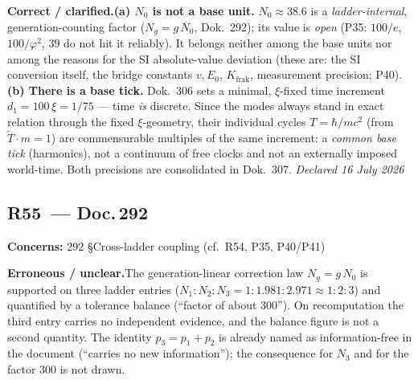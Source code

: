 \smallskip\noindent\textbf{Correct / clarified.}\quad \textbf{(a) $N_0$ is not a base unit.} $N_0\approx38.6$ is a \emph{ladder-internal}, generation-counting factor ($N_g=g\,N_0$, Dok.~292); its value is \emph{open} (P35: $100/e$, $100/\varphi^2$, $39$ do not hit it reliably). It belongs neither among the base units nor among the reasons for the SI absolute-value deviation (these are: the SI conversion itself, the bridge constants $v,E_0$, $K_{\text{frak}}$, measurement precision; P40). \textbf{(b) There is a base tick.} Dok.~306 sets a minimal, $\xi$-fixed time increment $d_1=100\,\xi=1/75$ --- time \emph{is} discrete. Since the modes always stand in exact relation through the fixed $\xi$-geometry, their individual cycles $T=\hbar/mc^2$ (from $\tilde T\cdot m=1$) are commensurable multiples of the same increment: a \emph{common base tick} (harmonics), not a continuum of free clocks and not an externally imposed world-time. Both precisions are consolidated in Dok.~307. \emph{Declared 16 July 2026}


\medskip


\subsection*{R55~--- Doc.\,292}

\noindent\textbf{Concerns:} 292 \S{}Cross-ladder coupling (cf.\ R54, P35, P40/P41)


\smallskip\noindent\textbf{Erroneous / unclear.}\quad The generation-linear correction law $N_g=g\,N_0$ is supported on three ladder entries ($N_1{:}N_2{:}N_3=1{:}1.981{:}2.971\approx1{:}2{:}3$) and quantified by a tolerance balance (\enquote{factor of about $300$}). On recomputation the third entry carries no independent evidence, and the balance figure is not a second quantity. The identity $p_3=p_1+p_2$ is already named as information-free in the document (\enquote{carries no new information}); the consequence for $N_3$ and for the factor $300$ is not drawn.


